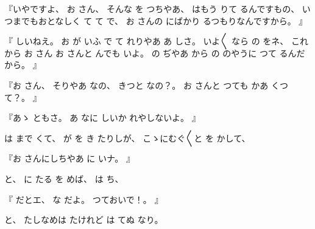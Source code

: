 %
『いやですよ、
%
お
さん、
%
そんな
を
つちやあ、
%
はもう
りて
るんですもの、
%
いつまでもおとなしく
て
て
で、
%
お
さんの
にばかり
るつもりなんですから。
』

%
『
しいねえ。
%
お
が
いふ
で
て
れりやあ
あ
しさ。
%
いよ〳〵
なら
の
をネ、
%
これから
お
さん
お
さんと
んでも
いよ。
%
の
ぢやあ
から
の
のやうに
つて
るんだから。
』

%
『お
さん、
%
そりやあ
なの、
%
きつと
なの？。
%
お
さんと
つても
かあ
くつて？。
』

%
『あゝ
ともさ。
%
あ
なに
しいか
れやしないよ。
』

%
は
まで
くて、
%
が
を
き
たりしが、
%
こゝにむぐ〳〵と
を
かして、

%
『お
さんにしちやあ
に
いナ。
』

%
と、
%
に
たる
を
めば、
%
は
ち、

%
『
だとエ、
%
な
だよ。
%
つておいで！。
』

%
と、
%
たしなめは
たけれど
は
てぬ
なり。

